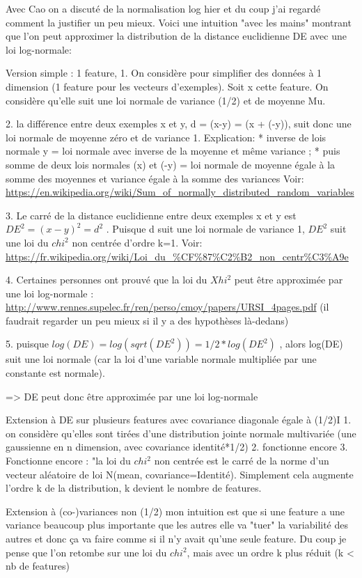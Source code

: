 Avec Cao on a discuté de la normalisation log hier et du coup j'ai regardé comment la justifier un peu mieux. Voici une intuition "avec les mains" montrant que l'on peut approximer la distribution de la distance euclidienne DE avec une loi log-normale:


Version simple : 1 feature, 
1. On considère pour simplifier des données à 1 dimension (1 feature pour les vecteurs d'exemples). Soit x cette feature. On considère qu'elle suit une loi normale de variance (1/2) et de moyenne Mu.

2. la différence entre deux exemples x et y,  d = (x-y) = (x + (-y)), suit donc une loi normale de moyenne zéro et de variance 1.  Explication:
* inverse de lois normale y = loi normale avec inverse de la moyenne et même variance ; 
* puis somme de deux lois normales (x) et (-y) = loi normale de moyenne égale à la somme des moyennes et variance égale à la somme des variances 
Voir: \url{https://en.wikipedia.org/wiki/Sum_of_normally_distributed_random_variables}

3. Le carré de la distance euclidienne entre deux exemples x et y est $DE^2 = (x-y)^2 = d^2$ . Puisque d suit une loi normale de variance 1, $DE^2$ suit une loi du $chi^2$ non centrée d'ordre k=1.
Voir: \url{https://fr.wikipedia.org/wiki/Loi_du_%CF%87%C2%B2_non_centr%C3%A9e}

4. Certaines personnes ont prouvé que la loi du $Xhi^2$ peut être approximée par une loi log-normale : \url{http://www.rennes.supelec.fr/ren/perso/cmoy/papers/URSI_4pages.pdf}
(il faudrait regarder un peu mieux si il y a des hypothèses là-dedans)

5. puisque $log(DE) = log(sqrt(DE^2)) = 1/2*log(DE^2)$  , alors log(DE) suit une loi normale (car la loi d'une variable normale multipliée par une constante est normale). 

=> DE peut donc être approximée par une loi log-normale


Extension à DE sur plusieurs features avec covariance diagonale égale à (1/2)I
1. on considère qu'elles sont tirées d'une distribution jointe normale multivariée (une gaussienne en n dimension, avec covariance identité*1/2)
2. fonctionne encore 
3. Fonctionne encore : "la loi du $chi^2$ non centrée est le carré de la norme d'un vecteur aléatoire de loi N(mean, covariance=Identité). Simplement cela augmente l'ordre k de la distribution, k devient le nombre de features.


Extension à (co-)variances non (1/2) 
mon intuition est que si une feature a une variance beaucoup plus importante que les autres elle va "tuer" la variabilité des autres et donc ça va faire comme si il n'y avait qu'une seule feature.
Du coup je pense que l'on retombe sur une loi du $chi^2$, mais avec un ordre k plus réduit (k < nb de features)


